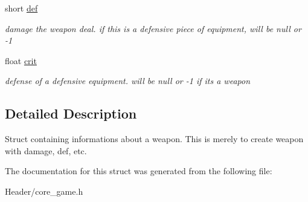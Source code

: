 \begin{DoxyCompactItemize}
\mbox{\label{structweapon__t_a5652d36725fed68cf0e48559fa9a2f23}} 
short \hyperlink{structweapon__t_a5652d36725fed68cf0e48559fa9a2f23}{def}
\begin{DoxyCompactList}\small\item\em damage the weapon deal. if this is a defensive piece of equipment, will be null or -\/1 \end{DoxyCompactList}\item 
\mbox{\label{structweapon__t_aa567753be9ba9c1da4037baaedd01e79}} 
float \hyperlink{structweapon__t_aa567753be9ba9c1da4037baaedd01e79}{crit}
\begin{DoxyCompactList}\small\item\em defense of a defensive equipment. will be null or -\/1 if it\textquotesingle{}s a weapon \end{DoxyCompactList}\end{DoxyCompactItemize}


\subsection{Detailed Description}
Struct containing informations about a weapon. This is merely to create weapon with damage, def, etc. 

The documentation for this struct was generated from the following file\+:\begin{DoxyCompactItemize}
\item 
Header/core\+\_\+game.\+h\end{DoxyCompactItemize}
